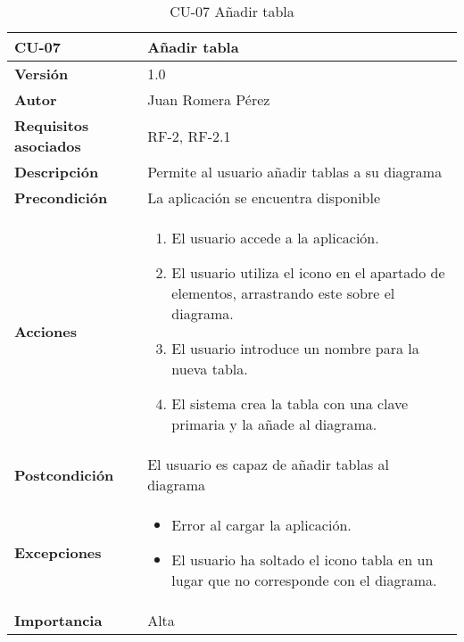 \begin{table}[p]
    \centering
    \begin{tabularx}{\linewidth}{ p{} p{}}
		\toprule
		\textbf{CU-07}    & \textbf{Añadir tabla}\\
		\toprule
		\textbf{Versión}              & 1.0    \\
		\textbf{Autor}                & Juan Romera Pérez \\
		\textbf{Requisitos asociados} & RF-2, RF-2.1 \\
		\textbf{Descripción}          & Permite al usuario añadir tablas a su diagrama \\
		\textbf{Precondición}         & La aplicación se encuentra disponible \\
		\textbf{Acciones}             &
		\begin{enumerate}
			\def\labelenumi{\arabic{enumi}.}
			\tightlist
			\item El usuario accede a la aplicación.
			\item El usuario utiliza el icono en el apartado de elementos, arrastrando este sobre el diagrama.
            \item El usuario introduce un nombre para la nueva tabla.
            \item El sistema crea la tabla con una clave primaria y la añade al diagrama.
		\end{enumerate}\\
		\textbf{Postcondición}        & El usuario es capaz de añadir tablas al diagrama \\
		\textbf{Excepciones}          & \begin{itemize}
		    \item Error al cargar la aplicación.
            \item El usuario ha soltado el icono tabla en un lugar que no corresponde con el diagrama.
		\end{itemize} \\
		\textbf{Importancia}          & Alta \\
		\bottomrule
    \end{tabularx}
    \caption{CU-07 Añadir tabla}
\end{table}

